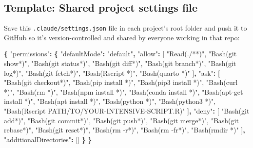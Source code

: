 \documentclass[
]{book}
\newenvironment{Shaded}{\begin{snugshade}}{\end{snugshade}}
\newcommand{\DataTypeTok}[1]{\textcolor[rgb]{0.13,0.29,0.53}{#1}}
\newcommand{\FunctionTok}[1]{\textcolor[rgb]{0.13,0.29,0.53}{\textbf{#1}}}
\newcommand{\OtherTok}[1]{\textcolor[rgb]{0.56,0.35,0.01}{#1}}
\newcommand{\StringTok}[1]{\textcolor[rgb]{0.31,0.60,0.02}{#1}}
\begin{document}
\subsection{Template: Shared project settings file}\label{template-shared-project-settings-file}

Save this \texttt{.claude/settings.json} file in each project's root folder and push it to GitHub so it's
version-controlled and shared by everyone working in that repo:

\begin{Shaded}
\begin{Highlighting}[]
\FunctionTok{\{}
  \DataTypeTok{"permissions"}\FunctionTok{:} \FunctionTok{\{}
    \DataTypeTok{"defaultMode"}\FunctionTok{:} \StringTok{"default"}\FunctionTok{,}
    \DataTypeTok{"allow"}\FunctionTok{:} \OtherTok{[}
      \StringTok{"Read(./**)"}\OtherTok{,}
      \StringTok{"Bash(git show*)"}\OtherTok{,}
      \StringTok{"Bash(git status*)"}\OtherTok{,}
      \StringTok{"Bash(git diff*)"}\OtherTok{,}
      \StringTok{"Bash(git branch*)"}\OtherTok{,}
      \StringTok{"Bash(git log*)"}\OtherTok{,}
      \StringTok{"Bash(git fetch*)"}\OtherTok{,}
      \StringTok{"Bash(Rscript *)"}\OtherTok{,}
      \StringTok{"Bash(quarto *)"}
    \OtherTok{]}\FunctionTok{,}
    \DataTypeTok{"ask"}\FunctionTok{:} \OtherTok{[}
      \StringTok{"Bash(git checkout*)"}\OtherTok{,}
      \StringTok{"Bash(pip install *)"}\OtherTok{,}
      \StringTok{"Bash(pip3 install *)"}\OtherTok{,}
      \StringTok{"Bash(curl *)"}\OtherTok{,}
      \StringTok{"Bash(rm *)"}\OtherTok{,}
      \StringTok{"Bash(npm install *)"}\OtherTok{,}
      \StringTok{"Bash(conda install *)"}\OtherTok{,}
      \StringTok{"Bash(apt{-}get install *)"}\OtherTok{,}
      \StringTok{"Bash(apt install *)"}\OtherTok{,}
      \StringTok{"Bash(python *)"}\OtherTok{,}
      \StringTok{"Bash(python3 *)"}\OtherTok{,}
      \StringTok{"Bash(Rscript PATH/TO/YOUR{-}INTENSIVE{-}SCRIPT.R)"}
    \OtherTok{]}\FunctionTok{,}
    \DataTypeTok{"deny"}\FunctionTok{:} \OtherTok{[}
      \StringTok{"Bash(git add*)"}\OtherTok{,}
      \StringTok{"Bash(git commit*)"}\OtherTok{,}
      \StringTok{"Bash(git push*)"}\OtherTok{,}
      \StringTok{"Bash(git merge*)"}\OtherTok{,}
      \StringTok{"Bash(git rebase*)"}\OtherTok{,}
      \StringTok{"Bash(git reset*)"}\OtherTok{,}
      \StringTok{"Bash(rm {-}r*)"}\OtherTok{,}
      \StringTok{"Bash(rm {-}fr*)"}\OtherTok{,}
      \StringTok{"Bash(rmdir *)"}
    \OtherTok{]}\FunctionTok{,}
    \DataTypeTok{"additionalDirectories"}\FunctionTok{:} \OtherTok{[]}
  \FunctionTok{\}}
\FunctionTok{\}}
\end{Highlighting}
\end{Shaded}
\end{document}
